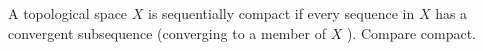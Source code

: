 A topological space  $ X $  is sequentially compact if every
sequence in  $ X $  has a convergent subsequence (converging to a member
of  $ X $ ). Compare
compact.


